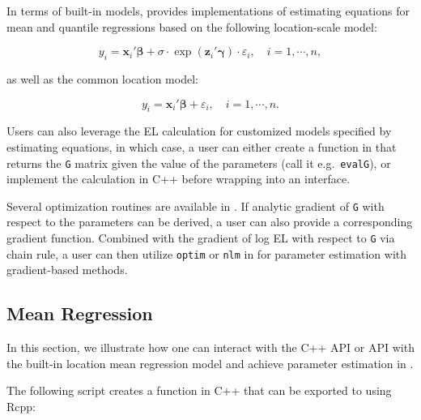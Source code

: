 \documentclass[article]{jss}
\newcommand{\s}{\sigma}
\newcommand{\xx}{\bm x}
\newcommand{\zz}{\bm z}
\newcommand{\bbe}{\bm \beta}
\newcommand{\gga}{\bm \gamma}
\newcommand{\e}{\varepsilon}
\renewcommand{\|}{\,|\,}
\begin{document}
In terms of built-in models,  provides implementations of estimating equations for mean and quantile regressions based on the following location-scale model:

\begin{equation} \label{md:lsmod}
  y_i = \xx_i'\bbe + \s\cdot\exp(\zz_i'\gga)\cdot\e_i, \quad i=1,\cdots,n,
\end{equation}

as well as the common location model:

\begin{equation} \label{md:lmod}
  y_i = \xx_i'\bbe + \e_i, \quad i=1,\cdots,n.
\end{equation}

Users can also leverage the EL calculation for customized models specified by estimating equations, in which case, a user can either create a function in  that returns the \texttt{G} matrix given the value of the parameters (call it e.g.~\texttt{evalG}), or implement the calculation in C++ before wrapping into an  interface.

Several optimization routines are available in . If analytic gradient of \texttt{G} with respect to the parameters can be derived, a user can also provide a corresponding gradient function. Combined with the gradient of log EL with respect to \texttt{G} via chain rule, a user can then utilize \texttt{optim} or \texttt{nlm} in  for parameter estimation with gradient-based methods.

\hypertarget{mean-regression}{%
\subsection{Mean Regression}\label{mean-regression}}

In this section, we illustrate how one can interact with the C++ API or  API with the built-in location mean regression model and achieve parameter estimation in .

The following script creates a function in C++ that can be exported to  using Rcpp:
\end{document}
